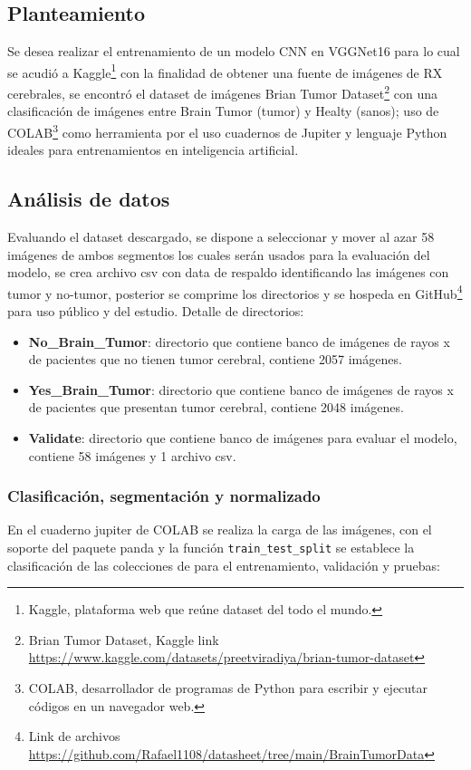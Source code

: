 \documentclass[12pt,twoside,titlepage]{ingenius}
\begin{document}
\begin{multicols}{2}
\subsection{Planteamiento}
Se desea realizar el entrenamiento de un modelo CNN en VGGNet16 para lo cual se acudió a Kaggle\footnote{Kaggle, plataforma web que reúne dataset del todo el mundo.}  con la finalidad de obtener una fuente de imágenes de RX cerebrales, se encontró el dataset de imágenes Brian Tumor Dataset\footnote{Brian Tumor Dataset, Kaggle link \url{https://www.kaggle.com/datasets/preetviradiya/brian-tumor-dataset}}  con una clasificación de imágenes entre Brain Tumor (tumor) y Healty (sanos); uso de COLAB\footnote{COLAB, desarrollador de programas de Python para escribir y ejecutar códigos en un navegador web.} como herramienta por el uso cuadernos de Jupiter y lenguaje Python ideales para entrenamientos en inteligencia artificial. 
\subsection{Análisis de datos}
Evaluando el dataset descargado, se dispone a seleccionar y mover al azar 58 imágenes de ambos segmentos los cuales serán usados para la evaluación del modelo, se crea archivo csv con data de respaldo identificando las imágenes con tumor y no-tumor, posterior se comprime los directorios y se hospeda en GitHub\footnote{Link de archivos \url{https://github.com/Rafael1108/datasheet/tree/main/BrainTumorData}} para uso público y del estudio.
Detalle de directorios:
\begin{itemize}
	\item \textbf{No\_Brain\_Tumor}: directorio que contiene banco de imágenes de rayos x de pacientes que no tienen tumor cerebral, contiene 2057 imágenes.
	\item \textbf{Yes\_Brain\_Tumor}: directorio que contiene banco de imágenes de rayos x de pacientes que presentan tumor cerebral, contiene 2048 imágenes.
	\item \textbf{Validate}: directorio que contiene banco de imágenes para evaluar el modelo, contiene 58 imágenes y 1 archivo csv.
\end{itemize}

\subsubsection{Clasificación, segmentación y normalizado} 
En el cuaderno jupiter de COLAB se realiza la carga de las imágenes, con el soporte del paquete panda y la función \texttt{train\_test\_split} se establece la clasificación de las colecciones de para el entrenamiento, validación y pruebas:


\end{multicols}
\end{document}
